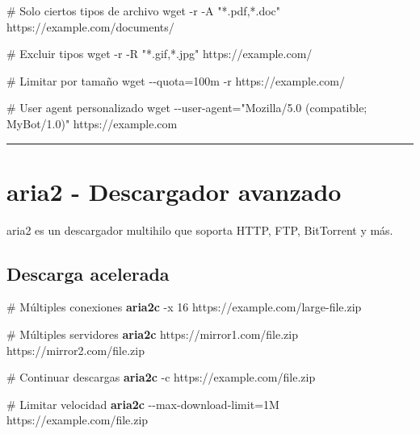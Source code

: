 \documentclass[
  11pt,
  letterpaper,
  oneside,
  openany]{scrbook}
\newenvironment{Shaded}{}{}
\newcommand{\AttributeTok}[1]{\textcolor[rgb]{0.84,0.23,0.29}{#1}}
\newcommand{\CommentTok}[1]{\textcolor[rgb]{0.42,0.45,0.49}{#1}}
\newcommand{\ExtensionTok}[1]{\textcolor[rgb]{0.84,0.23,0.29}{\textbf{#1}}}
\newcommand{\FunctionTok}[1]{\textcolor[rgb]{0.44,0.26,0.76}{#1}}
\newcommand{\NormalTok}[1]{\textcolor[rgb]{0.14,0.16,0.18}{#1}}
\newcommand{\OperatorTok}[1]{\textcolor[rgb]{0.14,0.16,0.18}{#1}}
\newcommand{\StringTok}[1]{\textcolor[rgb]{0.01,0.18,0.38}{#1}}
\begin{document}
\begin{Shaded}
\begin{Highlighting}[]
\CommentTok{\# Solo ciertos tipos de archivo}
\FunctionTok{wget} \AttributeTok{{-}r} \AttributeTok{{-}A} \StringTok{"*.pdf,*.doc"}\NormalTok{ https://example.com/documents/}

\CommentTok{\# Excluir tipos}
\FunctionTok{wget} \AttributeTok{{-}r} \AttributeTok{{-}R} \StringTok{"*.gif,*.jpg"}\NormalTok{ https://example.com/}

\CommentTok{\# Limitar por tamaño}
\FunctionTok{wget} \AttributeTok{{-}{-}quota}\OperatorTok{=}\NormalTok{100m }\AttributeTok{{-}r}\NormalTok{ https://example.com/}

\CommentTok{\# User agent personalizado}
\FunctionTok{wget} \AttributeTok{{-}{-}user{-}agent}\OperatorTok{=}\StringTok{"Mozilla/5.0 (compatible; MyBot/1.0)"}\NormalTok{ https://example.com}
\end{Highlighting}
\end{Shaded}

\begin{center}\rule{0.5\linewidth}{0.5pt}\end{center}

\section{aria2 - Descargador avanzado}\label{sec-aria2}

aria2 es un descargador multihilo que soporta HTTP, FTP, BitTorrent y
más.

\subsection{Descarga acelerada}\label{descarga-acelerada}

\begin{Shaded}
\begin{Highlighting}[]
\CommentTok{\# Múltiples conexiones}
\ExtensionTok{aria2c} \AttributeTok{{-}x}\NormalTok{ 16 https://example.com/large{-}file.zip}

\CommentTok{\# Múltiples servidores}
\ExtensionTok{aria2c}\NormalTok{ https://mirror1.com/file.zip https://mirror2.com/file.zip}

\CommentTok{\# Continuar descargas}
\ExtensionTok{aria2c} \AttributeTok{{-}c}\NormalTok{ https://example.com/file.zip}

\CommentTok{\# Limitar velocidad}
\ExtensionTok{aria2c} \AttributeTok{{-}{-}max{-}download{-}limit}\OperatorTok{=}\NormalTok{1M https://example.com/file.zip}
\end{Highlighting}
\end{Shaded}
\end{document}
